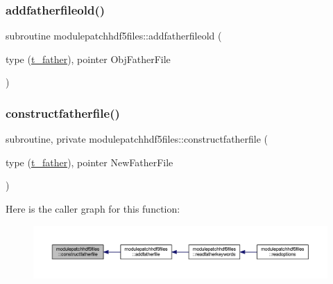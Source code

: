 \subsubsection{\texorpdfstring{addfatherfileold()}{addfatherfileold()}}
{\footnotesize\ttfamily subroutine modulepatchhdf5files\+::addfatherfileold (\begin{DoxyParamCaption}\item[{type (\mbox{\hyperlink{structmodulepatchhdf5files_1_1t__father}{t\+\_\+father}}), pointer}]{Obj\+Father\+File }\end{DoxyParamCaption})\hspace{0.3cm}{\ttfamily [private]}}

\mbox{\label{namespacemodulepatchhdf5files_ae8a0b9a239c86e85ad55ca1d7e782f96}} 
\subsubsection{\texorpdfstring{constructfatherfile()}{constructfatherfile()}}
{\footnotesize\ttfamily subroutine, private modulepatchhdf5files\+::constructfatherfile (\begin{DoxyParamCaption}\item[{type (\mbox{\hyperlink{structmodulepatchhdf5files_1_1t__father}{t\+\_\+father}}), pointer}]{New\+Father\+File }\end{DoxyParamCaption})\hspace{0.3cm}{\ttfamily [private]}}

Here is the caller graph for this function\+:\nopagebreak
\begin{figure}[H]
\begin{center}
\leavevmode
\includegraphics[width=350pt]{namespacemodulepatchhdf5files_ae8a0b9a239c86e85ad55ca1d7e782f96_icgraph}
\end{center}
\end{figure}
\mbox{\label{namespacemodulepatchhdf5files_af7d7ef8ef3c8bc4d3657d8e7e892efe3}} 
